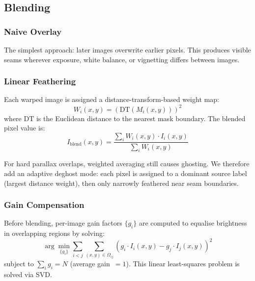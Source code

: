 \documentclass[conference]{IEEEtran}
\begin{document}
\subsection{Blending}

\subsubsection{Naive Overlay}
The simplest approach: later images overwrite earlier pixels. This produces
visible seams wherever exposure, white balance, or vignetting differs between
images.

\subsubsection{Linear Feathering}
Each warped image is assigned a distance-transform-based weight map:
\begin{equation}
  W_i(x,y) = \left(\text{DT}(M_i(x,y))\right)^2
\end{equation}
where $\text{DT}$ is the Euclidean distance to the nearest mask boundary.
The blended pixel value is:
\begin{equation}
  I_{\text{blend}}(x, y) = \frac{\sum_i W_i(x,y) \cdot I_i(x,y)}
                                 {\sum_i W_i(x,y)}
\end{equation}

For hard parallax overlaps, weighted averaging still causes ghosting. We
therefore add an adaptive deghost mode: each pixel is assigned to a dominant
source label (largest distance weight), then only narrowly feathered near seam
boundaries.

\subsubsection{Gain Compensation}
Before blending, per-image gain factors $\{g_i\}$ are computed to equalise
brightness in overlapping regions by solving:
\begin{equation}
  \arg\min_{\{g_i\}} \sum_{i < j} \sum_{(x,y) \in \Omega_{ij}}
    \left( g_i \cdot I_i(x,y) - g_j \cdot I_j(x,y) \right)^2
\end{equation}
subject to $\sum_i g_i = N$ (average gain~$= 1$). This linear least-squares
problem is solved via SVD.


\end{document}
